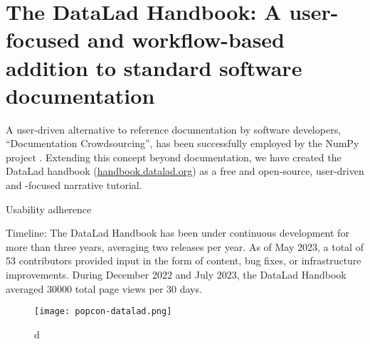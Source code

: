 \pagebreak

\section{The DataLad Handbook: A user-focused and workflow-based addition to standard software documentation}

A user-driven alternative to reference documentation by software developers, ``Documentation Crowdsourcing'', has been successfully employed by the NumPy project \citep{pawlik2014crowdsourcing}.
Extending this concept beyond documentation, we have created the DataLad handbook (\href{http://handbook.datalad.org}{handbook.datalad.org}) as a free and open-source, user-driven and -focused narrative tutorial.


Usability adherence

Timeline:
The DataLad Handbook has been under continuous development for more than three years, averaging two releases per year.
As of May 2023, a total of 53 contributors provided input in the form of content, bug fixes, or infrastructure improvements.
During December 2022 and July 2023, the DataLad Handbook averaged 30000 total page views per 30 days.


\begin{figure}
	\texttt{[image: popcon-datalad.png]}
	\caption{d}
	\label{fig:popcon}
\end{figure}

\pagebreak

